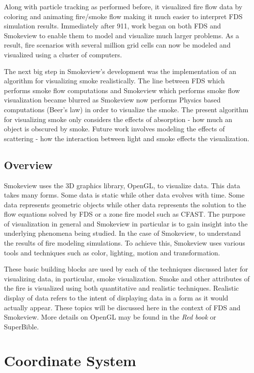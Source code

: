 \documentclass[11pt,twoside]{book}
\begin{document}
Along with particle tracking as performed before, it visualized fire flow data by coloring and animating fire/smoke flow making it much easier to interpret FDS simulation results.  Immediately after 911, work began on both FDS and Smokeview to enable them to model and visualize much larger problems.  As a result, fire scenarios with several million grid cells can now be modeled and visualized using a cluster of computers.

The next big step in Smokeview's development was the implementation of an algorithm for visualizing smoke realistically.   The line between FDS which performs smoke flow computations and Smokeview which performs smoke flow visualization became blurred as Smokeview now performs Physics based computations (Beer's law) in order to visualize the smoke.  The present algorithm for visualizing smoke only considers the effects of absorption - how much an object is obscured by smoke.  Future work involves modeling the effects of scattering - how the interaction between light and smoke effects the visualization.


\section{Overview}
Smokeview uses the 3D graphics library, OpenGL, to visualize data.
This data takes many forms.  Some data is static while other data evolves with time.
Some data represents geometric objects while other data represents the solution to the flow equations solved by FDS or a zone fire model such as CFAST.
The purpose of visualization in general and Smokeview in particular is to gain insight into the underlying phenomena being studied.  In the case of Smokeview, to
understand the results of fire modeling simulations.  To achieve this, Smokeview
uses various tools and techniques such as color, lighting, motion and transformation.

These basic building blocks are used by each of the techniques discussed later for visualizing data, in particular, smoke visualization.  Smoke and other attributes of the fire is visualized using both quantitative and realistic techniques.  Realistic display of data refers to the intent of displaying data in a form as it would actually appear.
These topics will be discussed here in the context of FDS and Smokeview.
More details on OpenGL may be found
in the {\em Red book}\cite{OpenGLRed} or SuperBible\cite{SUPERBIBLE}.


\chapter{Coordinate System}
\end{document}
